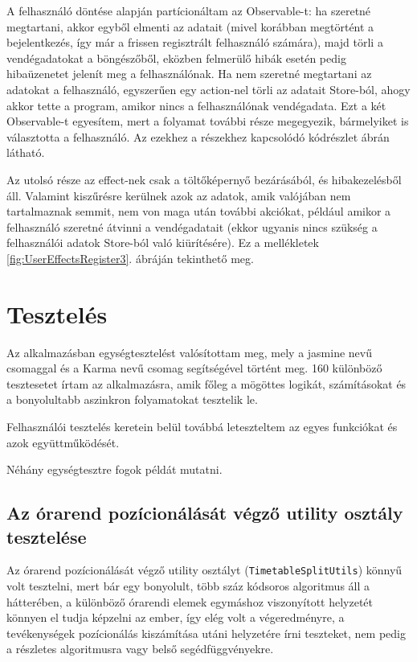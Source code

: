 \documentclass[a4paper,12pt]{report}
\begin{document}
A felhasználó döntése alapján partícionáltam az Observable-t: ha szeretné megtartani, akkor egyből elmenti az adatait (mivel korábban megtörtént a bejelentkezés, így már a frissen regisztrált felhasználó számára), majd törli a vendégadatokat a böngészőből, eközben felmerülő hibák esetén pedig hibaüzenetet jelenít meg a felhasználónak. Ha nem szeretné megtartani az adatokat a felhasználó, egyszerűen egy action-nel törli az adatait Store-ból, ahogy akkor tette a program, amikor nincs a felhasználónak vendégadata. Ezt a két Observable-t egyesítem, mert a folyamat további része megegyezik, bármelyiket is választotta a felhasználó. Az ezekhez a részekhez kapcsolódó kódrészlet  ábrán látható.

Az utolsó része az effect-nek csak a töltőképernyő bezárásából, és hibakezelésből áll. Valamint kiszűrésre kerülnek azok az adatok, amik valójában nem tartalmaznak semmit, nem von maga után további akciókat, például amikor a felhasználó szeretné átvinni a vendégadatait (ekkor ugyanis nincs szükség a felhasználói adatok Store-ból való kiürítésére). Ez a mellékletek \ref{fig:UserEffectsRegister3}. ábráján tekinthető meg.

\chapter{Tesztelés}

Az alkalmazásban egységtesztelést \cite{angular-testing} valósítottam meg, mely a jasmine nevű csomaggal és a Karma nevű csomag segítségével történt meg. 160 különböző tesztesetet írtam az alkalmazásra, amik főleg a mögöttes logikát, számításokat és a bonyolultabb aszinkron folyamatokat tesztelik le.

Felhasználói tesztelés keretein belül továbbá leteszteltem az egyes funkciókat és azok együttműködését.

Néhány egységtesztre fogok példát mutatni.

\section{Az órarend pozícionálását végző utility osztály tesztelése}

Az órarend pozícionálását végző utility osztályt (\verb|TimetableSplitUtils|) könnyű volt tesztelni, mert bár egy bonyolult, több száz kódsoros algoritmus áll a hátterében, a különböző órarendi elemek egymáshoz viszonyított helyzetét könnyen el tudja képzelni az ember, így elég volt a végeredményre, a tevékenységek pozícionálás kiszámítása utáni helyzetére írni teszteket, nem pedig a részletes algoritmusra vagy belső segédfüggvényekre.
\end{document}
